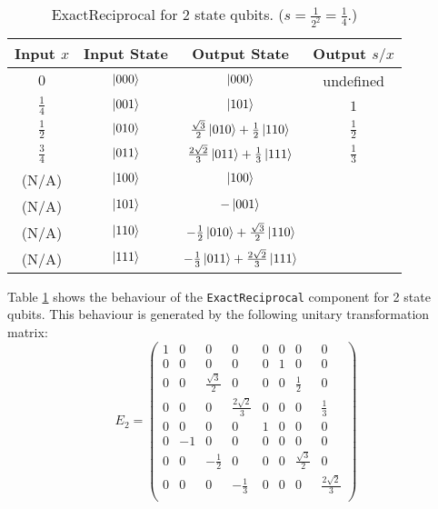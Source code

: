 \documentclass[12pt]{extarticle}
\begin{document}
\begin{table}[h!]
\centering
\begin{tabular}{|c|c|c|c|}
\hline
Input $x$     & Input State  & Output State                                              & Output $s/x$  \\
\hline
$0$           &  $\ket{000}$ &  $\ket{000}$                                              & undefined     \\
$\frac{1}{4}$ &  $\ket{001}$ &  $\ket{101}$                                              & $1$           \\
$\frac{1}{2}$ &  $\ket{010}$ & $\frac{\sqrt{3}}{2} \ket{010} + \frac{1}{2} \ket{110}$    & $\frac{1}{2}$ \\
$\frac{3}{4}$ &  $\ket{011}$ & $\frac{2 \sqrt{2}}{3} \ket{011} + \frac{1}{3} \ket{111}$  & $\frac{1}{3}$ \\
(N/A)         &  $\ket{100}$ & $\ket{100}$                                               & \\
(N/A)         &  $\ket{101}$ & $-\ket{001}$                                              & \\
(N/A)         &  $\ket{110}$ & $-\frac{1}{2} \ket{010} + \frac{\sqrt{3}}{2} \ket{110}$   & \\
(N/A)         &  $\ket{111}$ & $-\frac{1}{3} \ket{011} + \frac{2 \sqrt{2}}{3} \ket{111}$ & \\
\hline
\end{tabular}
\caption{ExactReciprocal for 2 state qubits. ($s=\frac{1}{2^2}=\frac{1}{4}$.)}
\label{tab:exactreciprocal2}
\end{table}

Table \ref{tab:exactreciprocal2} shows the behaviour of the \texttt{ExactReciprocal} component for 2 state qubits.
This behaviour is generated by the following unitary transformation matrix:
\[
E_2 = \begin{pmatrix}
1 &  0 & 0                  & 0                   & 0 & 0 & 0                  & 0 \\
0 &  0 & 0                  & 0                   & 0 & 1 & 0                  & 0 \\
0 &  0 & \frac{\sqrt{3}}{2} & 0                   & 0 & 0 & \frac{1}{2}        & 0 \\
0 &  0 & 0                  & \frac{2\sqrt{2}}{3} & 0 & 0 & 0                  & \frac{1}{3} \\
0 &  0 & 0                  & 0                   & 1 & 0 & 0                  & 0 \\
0 & -1 & 0                  & 0                   & 0 & 0 & 0                  & 0 \\
0 &  0 & -\frac{1}{2}       & 0                   & 0 & 0 & \frac{\sqrt{3}}{2} & 0 \\
0 &  0 & 0                  & -\frac{1}{3}        & 0 & 0 & 0                  & \frac{2\sqrt{2}}{3} \\
\end{pmatrix}
\]
\end{document}

